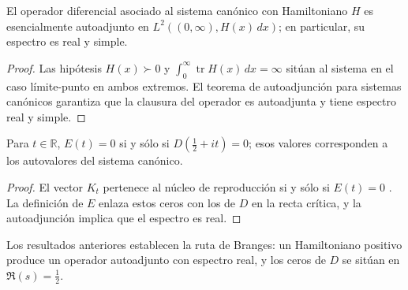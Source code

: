 \begin{proposition}[Autoadjunción]\label{prop:paper-selfadjoint}
El operador diferencial asociado al sistema canónico con Hamiltoniano $H$ es
esencialmente autoadjunto en $L^2((0,\infty),H(x)\,dx)$; en particular, su
espectro es real y simple.
\end{proposition}

\begin{proof}
Las hipótesis $H(x)\succ0$ y
$\int_0^{\infty}\operatorname{tr}H(x)\,dx=\infty$ sitúan al sistema en el caso
límite-punto en ambos extremos.  El teorema de autoadjunción para sistemas
canónicos \cite[Thm.~35]{deBranges1986} garantiza que la clausura del operador es
autoadjunta y tiene espectro real y simple.
\end{proof}

\begin{proposition}\label{prop:paper-spectrum}
Para $t\in\mathbb{R}$, $E(t)=0$ si y sólo si $D\!\left(\tfrac{1}{2}+it\right)=0$; esos
valores corresponden a los autovalores del sistema canónico.
\end{proposition}

\begin{proof}
El vector $K_t$ pertenece al núcleo de reproducción si y sólo si $E(t)=0$
\cite[Thm.~22]{deBranges1986}.  La definición de $E$ enlaza estos ceros con los
de $D$ en la recta crítica, y la autoadjunción implica que el espectro es real.
\end{proof}

Los resultados anteriores establecen la ruta de Branges: un Hamiltoniano positivo
produce un operador autoadjunto con espectro real, y los ceros de $D$ se sitúan en
$\Re(s)=\tfrac{1}{2}$.

